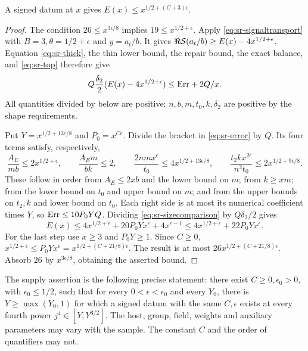 \begin{srproposition}\label{prop:sr-point}
A signed datum at \(x\) gives \(E(x)\leq x^{1/2+(C+3)\epsilon}\).
\end{srproposition}
\begin{proof}
The condition \(26\leq x^{3\epsilon/8}\) implies
\(19\leq x^{1/2+\epsilon}\).
Apply \eqref{eq:sr-signaltransport} with \(B=3,\theta=1/2+\epsilon\)
and \(y=a_t/b\). It gives
\(\Re{\cal S}(a_t/b)\geq E(x)-4x^{1/2+\epsilon}\).
Equation \eqref{eq:sr-thick}, the thin lower bound, the repair bound,
the exact balance, and \eqref{eq:sr-top} therefore give
\begin{equation}\label{eq:sr-sizecomparison}
 Q\frac{\delta_2}{2}(E(x)-4x^{1/2+\epsilon})
       \leq{\rm Err}+2Q/x.
\end{equation}
All quantities divided by below are positive: \(n,b,m,t_0,k,\delta_2\)
are positive by the shape requirements.

Put \(Y=x^{1/2+13\epsilon/8}\) and \(P_0=x^{C\epsilon}\).
Divide the bracket in \eqref{eq:sr-error} by \(Q\).
Its four terms satisfy, respectively,
\[
 \frac{A_E}{mb}\leq2x^{1/2+\epsilon},\qquad
 \frac{A_Em}{bk}\leq2,\qquad
 \frac{2nmx^\epsilon}{t_0}\leq4x^{1/2+13\epsilon/8},\qquad
 \frac{t_2kx^{2\epsilon}}{n^2t_0}\leq2x^{1/2+9\epsilon/8}.
\]
These follow in order from \(A_E\leq2xb\) and the lower bound on \(m\);
from \(k\geq xm\); from the lower bound on \(t_0\) and upper bound on \(m\);
and from the upper bounds on \(t_2,k\) and lower bound on \(t_0\).
Each right side is at most its numerical coefficient times \(Y\), so
\({\rm Err}\leq10P_0YQ\).
Dividing \eqref{eq:sr-sizecomparison} by \(Q\delta_2/2\) gives
\[
 E(x)\leq4x^{1/2+\epsilon}
       +20P_0Yx^\epsilon+4x^{\epsilon-1}
 \leq4x^{1/2+\epsilon}+22P_0Yx^\epsilon .
\]
For the last step use \(x\geq3\) and \(P_0Y\geq1\).
Since \(C\geq0\),
\(x^{1/2+\epsilon}\leq P_0Yx^\epsilon
=x^{1/2+(C+21/8)\epsilon}\).
The result is at most \(26x^{1/2+(C+21/8)\epsilon}\).
Absorb 26 by \(x^{3\epsilon/8}\), obtaining the asserted bound.
\end{proof}

\begin{srdefinition}\label{def:sr-supply}
The supply assertion is the following precise statement:
there exist \(C\geq0,\epsilon_0>0\), with \(\epsilon_0\leq1/2\), such that
for every \(0<\epsilon<\epsilon_0\) and every \(Y_0\), there is
\(Y\geq\max(Y_0,1)\) for which a signed datum with the same \(C,\epsilon\)
exists at every fourth power \(j^4\in[Y,Y^{3/2}]\).
The host, group, field, weights and auxiliary parameters may vary with
the sample. The constant \(C\) and the order of quantifiers may not.
\end{srdefinition}

